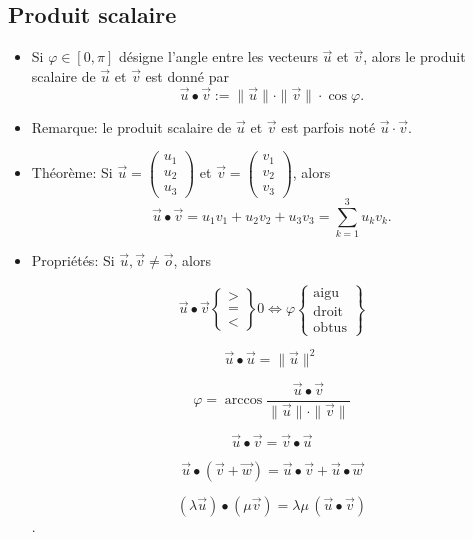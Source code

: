 \documentclass[12pt,a4paper]{article}
\newcommand{\vect}{\overrightarrow}
\begin{document}
\newpage
\subsection{Produit scalaire}
\begin{itemize}[label=$\bullet$]
\item Si $\varphi\in [0,\pi]$ désigne l'angle entre les vecteurs $\vect{u}$ et $\vect{v}$, alors le \colorbox{def!40}{produit scalaire} de $\vect{u}$ et $\vect{v}$ est donné par
\[\vect{u}\bullet\vect{v}:=\|\vect{u}\|\cdot\|\vect{v}\|\cdot\cos\varphi.\]
\item \textcolor{expl!60!black}{Remarque:} le produit scalaire de $\vect{u}$ et $\vect{v}$ est parfois noté $\vect{u}\cdot\vect{v}$.
\item \textcolor{th!60!black}{Théorème:} Si $\vect{u}=\begin{pmatrix}
u_1\\u_2\\u_3
\end{pmatrix}$ et $\vect{v}=\begin{pmatrix}
v_1\\v_2\\v_3
\end{pmatrix}$, alors \[\vect{u}\bullet\vect{v}=u_1v_1+u_2v_2+u_3v_3=\sum_{k=1}^3 u_kv_k.\]
\item \textcolor{th!60!black}{Propriétés:} Si $\vect{u},\vect{v}\neq\vect{o}$, alors

 $$\vect{u}\bullet\vect{v}\left\{\begin{array}{c} >\\=\\<\end{array}\right\}0\Longleftrightarrow \varphi\left\{\begin{array}{c} \mathrm{aigu}\\\mathrm{droit}\\\mathrm{obtus}\end{array}\right\}$$
 
 $$\vect{u}\bullet\vect{u}=\|\vect{u}\|^2$$
 
 $$\displaystyle\varphi=\arccos\frac{\vect{u}\bullet\vect{v}}{\|\vect{u}\|\cdot\|\vect{v}\|}$$
 
 $$\vect{u}\bullet\vect{v}=\vect{v}\bullet\vect{u}$$
 
$$\vect{u}\bullet(\vect{v}+\vect{w})=\vect{u}\bullet\vect{v}+\vect{u}\bullet\vect{w}$$

 $$(\lambda \vect{u})\bullet (\mu\vect{v})=\lambda\mu\,(\vect{u}\bullet \vect{v})$$.


\end{itemize}
\end{document}
